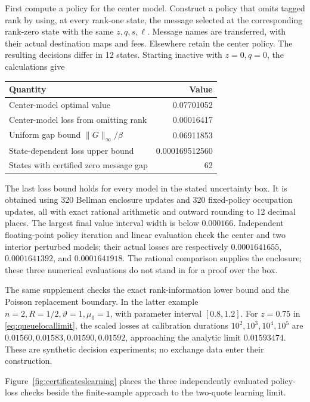 \documentclass[11pt]{article}
\theoremstyle{plain}
\theoremstyle{definition}
\theoremstyle{remark}
\begin{document}
First compute a policy for the center model. Construct a policy
that omits tagged rank by using, at every rank-one state, the
message selected at the corresponding rank-zero state with the
same \(z,q,s,\ell\). Message names are transferred, with their
actual destination maps and fees. Elsewhere retain the center
policy. The resulting decisions differ in 12 states.
Starting inactive with \(z=0,q=0\), the calculations give
\begin{center}
\begin{tabular}{@{}lr@{}}
\toprule
Quantity&Value\\
\midrule
Center-model optimal value&0.07701052\\
Center-model loss from omitting rank&0.00016417\\
Uniform gap bound \(\|G\|_\infty/\beta\)&0.06911853\\
State-dependent loss upper bound&0.000169512560\\
States with certified zero message gap&62\\
\bottomrule
\end{tabular}
\end{center}
The last loss bound holds for every model in the stated uncertainty
box. It is obtained using 320 Bellman enclosure updates and 320
fixed-policy occupation updates, all with exact rational arithmetic
and outward rounding to 12 decimal places. The largest final value
interval width is below \(0.000166\).
Independent floating-point policy iteration and linear evaluation
check the center and two interior perturbed models; their actual
losses are respectively \(0.0001641655\), \(0.0001641392\), and
\(0.0001641918\). The rational comparison supplies the enclosure;
these three numerical evaluations do not stand in for a proof
over the box.

The same supplement checks the exact rank-information lower bound
and the Poisson replacement boundary. In the latter example
\(n=2,R=1/2,\vartheta=1,\mu_0=1\), with parameter interval
\([0.8,1.2]\). For \(z=0.75\) in
\eqref{eq:queuelocallimit}, the scaled losses at calibration
durations \(10^2,10^3,10^4,10^5\) are
\(0.01560,0.01583,0.01590,0.01592\), approaching the analytic
limit \(0.01593474\). These are synthetic decision experiments;
no exchange data enter their construction.

Figure~\ref{fig:certificateslearning} places the three independently
evaluated policy-loss checks beside the finite-sample approach to the
two-quote learning limit.
\end{document}
